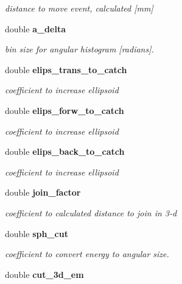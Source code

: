 \begin{DoxyCompactItemize}
\begin{DoxyCompactList}\small\item\em distance to move event, calculated [mm] \end{DoxyCompactList}\item 
double {\bf a\-\_\-delta}
\begin{DoxyCompactList}\small\item\em bin size for angular histogram [radians]. \end{DoxyCompactList}\item 
double {\bf elips\-\_\-trans\-\_\-to\-\_\-catch}\label{classDeepAnalysis_1_1Detector_a5dd97d0cc7dabe089212ab639aefb9bc}

\begin{DoxyCompactList}\small\item\em coefficient to increase ellipsoid \end{DoxyCompactList}\item 
double {\bf elips\-\_\-forw\-\_\-to\-\_\-catch}\label{classDeepAnalysis_1_1Detector_a77b3bf04bab6b285f2fb3808706e7b42}

\begin{DoxyCompactList}\small\item\em coefficient to increase ellipsoid \end{DoxyCompactList}\item 
double {\bf elips\-\_\-back\-\_\-to\-\_\-catch}\label{classDeepAnalysis_1_1Detector_add94b7d17684d76847b8170da5918a6f}

\begin{DoxyCompactList}\small\item\em coefficient to increase ellipsoid \end{DoxyCompactList}\item 
double {\bf join\-\_\-factor}\label{classDeepAnalysis_1_1Detector_a186726eac821fd90e8638c0ba9d0cc9c}

\begin{DoxyCompactList}\small\item\em coefficient to calculated distance to join in 3-\/d \end{DoxyCompactList}\item 
double {\bf sph\-\_\-cut}
\begin{DoxyCompactList}\small\item\em coefficient to convert energy to angular size. \end{DoxyCompactList}\item 
double {\bf cut\-\_\-3d\-\_\-em}\label{classDeepAnalysis_1_1Detector_adf47a8478cdfedfc4265a9641a44e568}


\end{DoxyCompactItemize}
